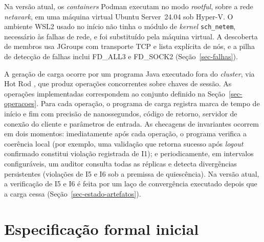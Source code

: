 Na versão atual, os \emph{containers} Podman executam no modo \emph{rootful}, sobre a rede \emph{netavark}, em uma máquina virtual Ubuntu Server~24.04 sob Hyper-V. O ambiente WSL2 usado no início não tinha o módulo de \emph{kernel} \texttt{sch\_netem}, necessário às falhas de rede, e foi substituído pela máquina virtual. A descoberta de membros usa JGroups com transporte TCP e lista explícita de nós, e a pilha de detecção de falhas inclui FD\_ALL3 e FD\_SOCK2 (Seção~\ref{sec-falhas}).

A geração de carga ocorre por um programa Java executado fora do \emph{cluster}, via Hot Rod \citep{infinispan_docs_stable}, que produz operações concorrentes sobre chaves de sessão. As operações implementadas correspondem ao conjunto definido na Seção~\ref{sec-operacoes}. Para cada operação, o programa de carga registra marca de tempo de início e fim com precisão de nanossegundos, código de retorno, servidor de conexão do cliente e parâmetros de entrada. As checagens de invariantes ocorrem em dois momentos: imediatamente após cada operação, o programa verifica a coerência local (por exemplo, uma validação que retorna sucesso após \emph{logout} confirmado constitui violação registrada de I1); e periodicamente, em intervalos configuráveis, um auditor consulta todas as réplicas e detecta divergências persistentes (violações de I5 e I6 sob a premissa de quiescência). Na versão atual, a verificação de I5 e I6 é feita por um laço de convergência executado depois que a carga cessa (Seção~\ref{sec-estado-artefatos}).

\section{Especificação formal inicial}
\label{sec-spec-formal}

